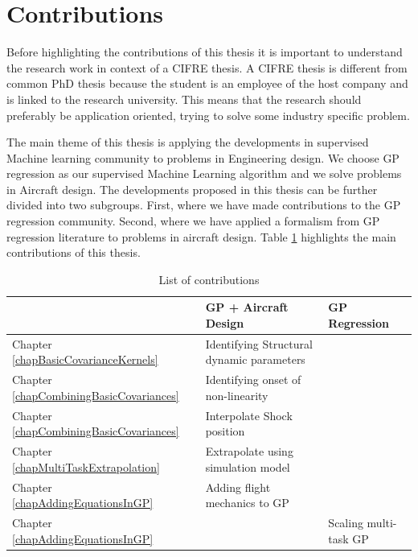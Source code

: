 \section{Contributions}\label{secCh1Contributions}
Before highlighting the contributions of this thesis it is important to understand the research work in context of a CIFRE thesis. A CIFRE thesis is different from common PhD thesis because the student is an employee of the host company and is linked to the research university. This means that the research should preferably be application oriented, trying to solve some industry specific problem.

The main theme of this thesis is applying the developments in supervised Machine learning community to problems in  Engineering design. We choose GP regression as our supervised Machine Learning algorithm and we solve problems in Aircraft design. The developments proposed in this thesis can be further divided into two subgroups. First, where we have made contributions to the GP regression community. Second, where we have applied a formalism from GP regression literature to problems in aircraft design. Table \ref{tabListOfContributions} highlights the main contributions of this thesis.

\begin{table}[!ht]
\centering
\begin{tabularx}{\textwidth}{|l|X|X|}
  \hline
  & GP + Aircraft Design & GP Regression \\
  \hline 
  \hline
Chapter \ref{chapBasicCovarianceKernels}& Identifying Structural dynamic parameters \cite{chiplunkar2017operational} &\\
\hline
Chapter \ref{chapCombiningBasicCovariances} & Identifying onset of non-linearity \cite{chiplunkar:hal-01555401} &\\
\hline
Chapter \ref{chapCombiningBasicCovariances} & Interpolate Shock position \cite{oatao18004} &\\
\hline
Chapter \ref{chapMultiTaskExtrapolation} & Extrapolate using simulation model &\\
\hline
Chapter \ref{chapAddingEquationsInGP} & Adding flight mechanics to GP \cite{oatao18001} &\\
\hline
Chapter \ref{chapAddingEquationsInGP} & & Scaling multi-task GP  \cite{icpram16Ankit, oatao18000}  \\
  \hline 
  \end{tabularx}
  \label{tabListOfContributions}
  \caption{List of contributions}
  \end{table}

